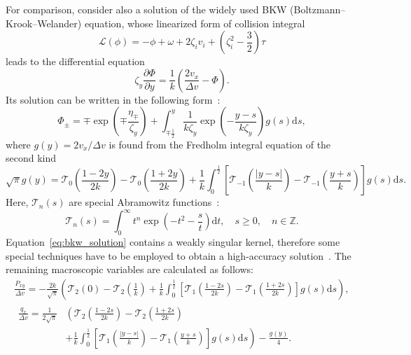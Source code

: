 \documentclass[]{elsarticle} %
\newcommand{\dd}{\mathrm{d}}
\newcommand{\pder}[2][]{\frac{\partial#1}{\partial#2}}
\begin{document}
For comparison, consider also a solution of the widely used BKW (Boltzmann--Krook--Welander) equation,
whose linearized form of collision integral
\begin{equation}\label{eq:linear_bkw}
    \mathcal{L}(\phi) = -\phi + \omega + 2\zeta_i v_i + \left(\zeta_i^2-\frac32\right)\tau
\end{equation}
leads to the differential equation
\begin{equation}\label{eq:linear_bkw_equation}
    \zeta_y \pder[\Phi]{y} = \frac1{k}\left( \frac{2v_x}{\Delta{v}} - \Phi \right).
\end{equation}
Its solution can be written in the following form~\citep{Willis1962}:
\begin{equation}\label{eq:bkw_solution}
    \Phi_\pm = \mp \exp\left(\mp\frac{\eta_\mp}{\zeta_y}\right) +
        \int_{\mp\frac12}^y \frac1{k\zeta_y} \exp \left(-\frac{y-s}{k\zeta_y}\right) g(s) \dd{s},
\end{equation}
where \(g(y) = 2v_x/\Delta v\) is found from the Fredholm integral equation of the second kind
\begin{equation}\label{eq:bkw_g_equation}
    \sqrt{\pi} g(y) = \mathcal{T}_0 \left(\frac{1-2y}{2k}\right) - \mathcal{T}_0 \left(\frac{1+2y}{2k}\right)
        + \frac1k \int_0^{\frac12} \left[ \mathcal{T}_{-1}\left(\frac{|y-s|}{k}\right)
        - \mathcal{T}_{-1}\left(\frac{y+s}{k}\right) \right] g(s) \dd{s}.
\end{equation}
Here, \(\mathcal{T}_n(s)\) are special Abramowitz functions~\citep{Abramowitz1972}:
\begin{equation}\label{eq:Abramowitz}
    \mathcal{T}_n(s) = \int_0^\infty t^n \exp\left(-t^2-\frac{s}{t}\right) \dd t,
    \quad s\ge0, \quad n \in \mathbb{Z}.
\end{equation}
Equation~\eqref{eq:bkw_solution} contains a weakly singular kernel,
therefore some special techniques have to be employed to obtain
a high-accuracy solution~\cite{Luo2015, Luo2016}.
The remaining macroscopic variables are calculated as follows:
\begin{gather}
    \frac{P_{xy}}{\Delta v} = -\frac{2k}{\sqrt{\pi}} \left(
        \mathcal{T}_2(0)-\mathcal{T}_2\left(\frac1k\right)
        + \frac1k\int_0^{\frac12}\left[
            \mathcal{T}_1\left(\frac{1-2s}{2k}\right)-\mathcal{T}_1\left(\frac{1+2s}{2k}\right)
        \right]g(s)\dd{s}
        \right), \label{eq:bkw_macro_Pxy} \\
    \begin{aligned}
    \frac{q_x}{\Delta v} = \frac1{2\sqrt{\pi}}&\left(
        \mathcal{T}_2\left(\frac{1-2s}{2k}\right) - \mathcal{T}_2\left(\frac{1+2s}{2k}\right)\right. \\
        &+\left. \frac1k\int_0^{\frac12}\left[
            \mathcal{T}_1\left(\frac{|y-s|}k\right)-\mathcal{T}_1\left(\frac{y+s}k\right)
        \right]g(s)\dd{s}
        \right) - \frac{g(y)}4.
    \end{aligned} \label{eq:bkw_macro_qx}
\end{gather}
\end{document}
